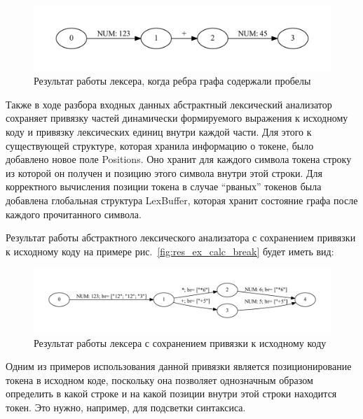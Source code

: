 \begin{figure}[t]
\centering
\includegraphics[width=\textwidth]{Polubelova/res_ex_space}
\caption{Результат работы лексера, когда ребра графа содержали пробелы}
\label{fig:res_ex_space} 
\end{figure}

Также в ходе разбора входных данных абстрактный лексический анализатор сохраняет привязку частей динамически формируемого выражения к исходному коду и 
привязку лексических единиц внутри каждой части. Для этого к существующей структуре, которая хранила информацию о токене, было добавлено новое поле Positions.
Оно хранит для каждого символа токена строку из которой он получен и позицию этого символа внутри этой строки.  Для корректного вычисления позиции токена в
случае “рваных” токенов была добавлена глобальная структура LexBuffer, которая хранит состояние графа после каждого прочитанного символа. 

Результат работы абстрактного лексического анализатора с сохранением привязки к исходному коду на примере рис.~\ref{fig:res_ex_calc_break} будет иметь вид:

\begin{figure}[t]
\centering
\includegraphics[width=\textwidth]{Polubelova/res_ex_calc_bounded}
\caption{Результат работы лексера с сохранением привязки к исходному коду}
\label{fig:res_ex_calc_bounded} 
\end{figure}	


Одним из примеров использования данной привязки является позиционирование токена в исходном коде, поскольку она позволяет однозначным образом определить
в какой строке и на какой позиции внутри этой строки находится токен. Это нужно, например, для подсветки синтаксиса. 

